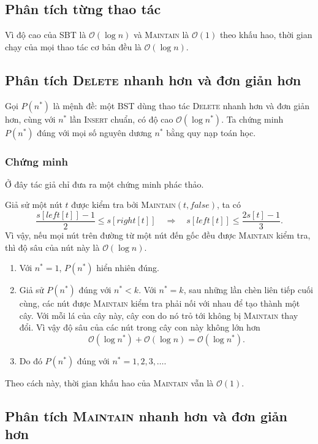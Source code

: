 \documentclass[11pt]{article}
\newcommand{\Oh}{\mathcal{O}}
\begin{document}
\subsection{Phân tích từng thao tác}

Vì độ cao của SBT là $\Oh(\log n)$ và \textsc{Maintain} là $\Oh(1)$ theo khấu
hao, thời gian chạy của mọi thao tác cơ bản đều là $\Oh(\log n)$.

\subsection{Phân tích \textsc{Delete} nhanh hơn và đơn giản hơn}

Gọi $P(n^*)$ là mệnh đề: một BST dùng thao tác \textsc{Delete} nhanh hơn và
đơn giản hơn, cùng với $n^*$ lần \textsc{Insert} chuẩn, có độ cao
$\Oh(\log n^*)$. Ta chứng minh $P(n^*)$ đúng với mọi số nguyên dương $n^*$
bằng quy nạp toán học.

\subsubsection{Chứng minh}

Ở đây tác giả chỉ đưa ra một chứng minh phác thảo.

Giả sử một nút $t$ được kiểm tra bởi
\textsc{Maintain}$(t,\textit{false})$, ta có
\[
  \frac{s[\mathit{left}[t]]-1}{2}\le s[\mathit{right}[t]]
  \quad\Rightarrow\quad
  s[\mathit{left}[t]]\le \frac{2s[t]-1}{3}.
\]
Vì vậy, nếu mọi nút trên đường từ một nút đến gốc đều được
\textsc{Maintain} kiểm tra, thì độ sâu của nút này là $\Oh(\log n)$.

\begin{enumerate}
  \item Với $n^*=1$, $P(n^*)$ hiển nhiên đúng.
  \item Giả sử $P(n^*)$ đúng với $n^*<k$. Với $n^*=k$, sau những lần chèn liên
  tiếp cuối cùng, các nút được \textsc{Maintain} kiểm tra phải nối với nhau để
  tạo thành một cây. Với mỗi lá của cây này, cây con do nó trỏ tới không bị
  \textsc{Maintain} thay đổi. Vì vậy độ sâu của các nút trong cây con này
  không lớn hơn
  \[
    \Oh(\log n^*)+\Oh(\log n)=\Oh(\log n^*).
  \]
  \item Do đó $P(n^*)$ đúng với $n^*=1,2,3,\ldots$.
\end{enumerate}

Theo cách này, thời gian khấu hao của \textsc{Maintain} vẫn là $\Oh(1)$.

\subsection{Phân tích \textsc{Maintain} nhanh hơn và đơn giản hơn}
\end{document}
